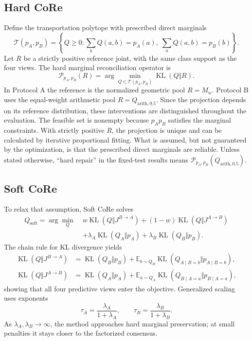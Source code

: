 \documentclass[a4paper,fleqn]{cas-sc}
\newcommand{\KL}{\operatorname{KL}}
\newcommand{\E}{\mathbb{E}}
\newcommand{\Jone}{J^{B\rightarrow A}}
\newcommand{\Jtwo}{J^{A\rightarrow B}}
\newcommand{\Qsoft}{Q_{\mathrm{soft}}}
\begin{document}
\subsection{Hard CoRe}
Define the transportation polytope with prescribed direct marginals
\begin{equation}
\mathcal{T}(p_A,p_B)=\left\{Q\ge0:\sum_bQ(a,b)=p_A(a),\;\sum_aQ(a,b)=p_B(b)\right\}.
\end{equation}
Let $R$ be a strictly positive reference joint, with the same class support as the four views. The hard marginal reconciliation operator is
\begin{equation}
\label{eq:hard-general}
\mathcal{P}_{p_A,p_B}(R)=\arg\min_{Q\in\mathcal{T}(p_A,p_B)}\KL(Q\Vert R).
\end{equation}
In Protocol A the reference is the normalized geometric pool $R=M_w$. Protocol B uses the equal-weight arithmetic pool $R=Q_{\mathrm{arith},0.5}$. Since the projection depends on its reference distribution, these interventions are distinguished throughout the evaluation. The feasible set is nonempty because $p_Ap_B$ satisfies the marginal constraints. With strictly positive $R$, the projection is unique and can be calculated by iterative proportional fitting. What is assumed, but not guaranteed by the optimization, is that the prescribed direct marginals are reliable. Unless stated otherwise, ``hard repair'' in the fixed-test results means $\mathcal{P}_{p_A,p_B}(Q_{\mathrm{arith},0.5})$.

\subsection{Soft CoRe}
To relax that assumption, Soft CoRe solves
\begin{align}
\Qsoft=\arg\min_Q\;&w\KL(Q\Vert\Jone)+(1-w)\KL(Q\Vert\Jtwo)\nonumber\\
&+\lambda_A\KL(Q_A\Vert p_A)+\lambda_B\KL(Q_B\Vert p_B).
\end{align}
The chain rule for KL divergence yields
\begin{align}
\KL(Q\Vert\Jone)&=\KL(Q_B\Vert p_B)+\E_{b\sim Q_B}\KL(Q_{A\mid B=b}\Vert p_{A\mid B=b}),\\
\KL(Q\Vert\Jtwo)&=\KL(Q_A\Vert p_A)+\E_{a\sim Q_A}\KL(Q_{B\mid A=a}\Vert p_{B\mid A=a}),
\end{align}
showing that all four predictive views enter the objective. Generalized scaling uses exponents
\begin{equation}
\tau_A=\frac{\lambda_A}{1+\lambda_A},\qquad
\tau_B=\frac{\lambda_B}{1+\lambda_B}.
\end{equation}
As $\lambda_A,\lambda_B\rightarrow\infty$, the method approaches hard marginal preservation; at small penalties it stays closer to the factorized consensus.
\end{document}

